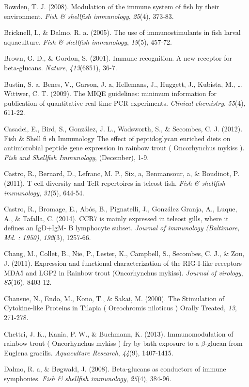 \documentclass[12pt,letterpaper,oneside]{scrbook}
\begin{document}
Bowden, T. J. (2008). Modulation of the immune system of fish by their
environment. \emph{Fish \& shellfish immunology}, \emph{25}(4), 373-83.

Bricknell, I., \& Dalmo, R. a. (2005). The use of immunostimulants in
fish larval aquaculture. \emph{Fish \& shellfish immunology},
\emph{19}(5), 457-72.

Brown, G. D., \& Gordon, S. (2001). Immune recognition. A new receptor
for beta-glucans. \emph{Nature}, \emph{413}(6851), 36-7.

Bustin, S. a, Benes, V., Garson, J. a, Hellemans, J., Huggett, J.,
Kubista, M., \ldots{} Wittwer, C. T. (2009). The MIQE guidelines:
minimum information for publication of quantitative real-time PCR
experiments. \emph{Clinical chemistry}, \emph{55}(4), 611-22.

Casadei, E., Bird, S., González, J. L., Wadsworth, S., \& Secombes, C.
J. (2012). Fish \& Shell fi sh Immunology The effect of peptidoglycan
enriched diets on antimicrobial peptide gene expression in rainbow trout
( Oncorhynchus mykiss ). \emph{Fish and Shellfish Immunology},
(December), 1-9.

Castro, R., Bernard, D., Lefranc, M. P., Six, a, Benmansour, a, \&
Boudinot, P. (2011). T cell diversity and TcR repertoires in teleost
fish. \emph{Fish \& shellfish immunology}, \emph{31}(5), 644-54.

Castro, R., Bromage, E., Abós, B., Pignatelli, J., {González Granja},
A., Luque, A., \& Tafalla, C. (2014). CCR7 is mainly expressed in
teleost gills, where it defines an IgD+IgM- B lymphocyte subset.
\emph{Journal of immunology (Baltimore, Md. : 1950)}, \emph{192}(3),
1257-66.

Chang, M., Collet, B., Nie, P., Lester, K., Campbell, S., Secombes, C.
J., \& Zou, J. (2011). Expression and functional characterization of the
RIG-I-like receptors MDA5 and LGP2 in Rainbow trout (Oncorhynchus
mykiss). \emph{Journal of virology}, \emph{85}(16), 8403-12.

Chansue, N., Endo, M., Kono, T., \& Sakai, M. (2000). The Stimulation of
Cytokine-like Proteins in Tilapia ( Oreochromis niloticus ) Orally
Treated, \emph{13}, 271-278.

Chettri, J. K., Kania, P. W., \& Buchmann, K. (2013). Immunomodulation
of rainbow trout ( Oncorhynchus mykiss ) fry by bath exposure to a
\(\beta\)-glucan from Euglena gracilis. \emph{Aquaculture Research},
\emph{44}(9), 1407-1415.

Dalmo, R. a, \& Bøgwald, J. (2008). Beta-glucans as conductors of immune
symphonies. \emph{Fish \& shellfish immunology}, \emph{25}(4), 384-96.
\end{document}

